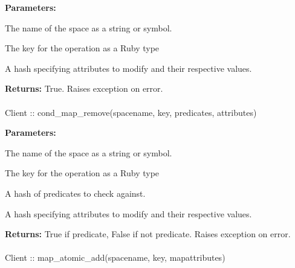 \noindent\textbf{Parameters:}
\begin{description}[labelindent=\widthof{{\code{attributes}}},leftmargin=*,noitemsep,nolistsep,align=right]
\item[\code{spacename}] The name of the space as a string or symbol.
\item[\code{key}] The key for the operation as a Ruby type
\item[\code{attributes}] A hash specifying attributes to modify and their respective values.
\end{description}

\noindent\textbf{Returns:}
True.  Raises exception on error.

\paragraph{}
\label{api:ruby:cond_map_remove}
\begin{ccode}
Client :: cond_map_remove(spacename, key, predicates, attributes)
\end{ccode}
\funcdesc 

\noindent\textbf{Parameters:}
\begin{description}[labelindent=\widthof{{\code{predicates}}},leftmargin=*,noitemsep,nolistsep,align=right]
\item[\code{spacename}] The name of the space as a string or symbol.
\item[\code{key}] The key for the operation as a Ruby type
\item[\code{predicates}] A hash of predicates to check against.
\item[\code{attributes}] A hash specifying attributes to modify and their respective values.
\end{description}

\noindent\textbf{Returns:}
True if predicate, False if not predicate.  Raises exception on error.

\paragraph{}
\label{api:ruby:map_atomic_add}
\begin{ccode}
Client :: map_atomic_add(spacename, key, mapattributes)
\end{ccode}
\funcdesc 

